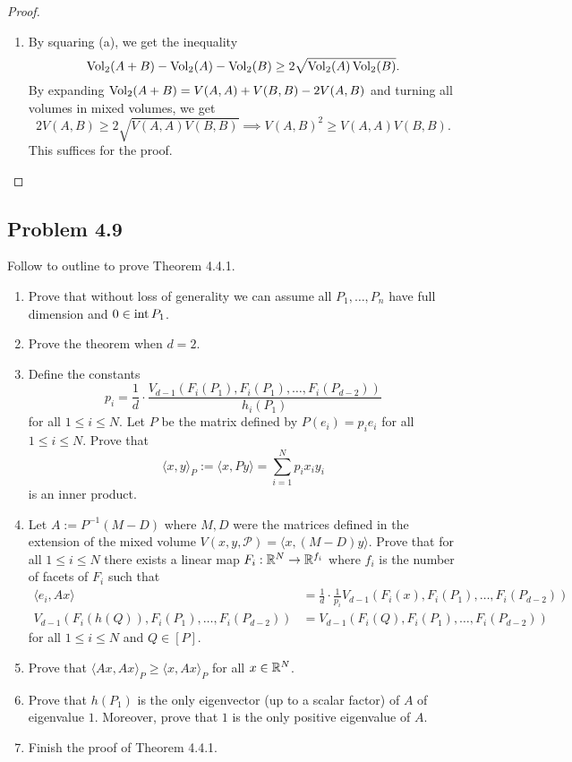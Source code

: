 \documentclass[12pt]{article}
\begin{document}
\begin{proof}
\begin{enumerate}[label = (\alph*)]
		\item By squaring (a), we get the inequality 
		\[
			\operatorname{Vol}_2(A + B) - \operatorname{Vol}_2(A) - \operatorname{Vol}_2(B) \geq 2 \sqrt{\operatorname{Vol}_2(A) \operatorname{Vol}_2(B)}.
		\]
		By expanding $\operatorname{Vol}_2(A + B) = V(A, A) + V(B, B) - 2 V(A, B)$ and turning all volumes in mixed volumes, we get 
		\[
			2V(A, B) \geq 2 \sqrt{V(A, A) V(B, B)} \implies V(A, B)^2 \geq V(A, A) V(B, B). 
		\]
		This suffices for the proof. 
	\end{enumerate}
\end{proof}

\newpage 

\subsection{Problem 4.9}

\begin{problem} \label{problem-4.9}
	Follow to outline to prove Theorem 4.4.1.
    \begin{enumerate}[label = (\alph*)]
        \item Prove that without loss of generality we can assume all $P_1, \ldots, P_n$ have full dimension and $0 \in \operatorname{int} P_1$.
        \item Prove the theorem when $d = 2$. 
        \item Define the constants 
        \[
            p_i = \frac{1}{d} \cdot \frac{V_{d-1}(F_i(P_1), F_i(P_1), \ldots, F_i(P_{d-2}))}{h_i(P_1)}
        \]
        for all $1 \leq i \leq N$. Let $P$ be the matrix defined by $P(e_i) = p_i e_i$ for all $1 \leq i \leq N$. Prove that 
        \[
            \langle x, y \rangle_P := \langle x, Py \rangle = \sum_{i = 1}^N p_i x_i y_i  
        \]
        is an inner product. 
        \item Let $A := P^{-1}(M-D)$ where $M, D$ were the matrices defined in the extension of the mixed volume $V(x, y, \mathcal{P}) = \langle x, (M-D)y \rangle$. Prove that for all $1 \leq i \leq N$ there exists a linear map $F_i : \mathbb{R}^N \to \mathbb{R}^{f_i}$ where $f_i$ is the number of facets of $F_i$ such that 
        \begin{align*}
            \langle e_i, A x \rangle & = \frac{1}{d} \cdot \frac{1}{p_i} V_{d-1}(F_i(x), F_i(P_1), \ldots, F_i(P_{d-2})) \\
            V_{d-1}(F_i(h(Q)), F_i(P_1), \ldots, F_i(P_{d-2})) & = V_{d-1}(F_i(Q), F_i(P_1), \ldots, F_i(P_{d-2}))
        \end{align*}
        for all $1 \leq i \leq N$ and $Q \in [P]$. 
        \item Prove that $\langle Ax, Ax \rangle_P \geq \langle x, Ax \rangle_P$ for all $x \in \mathbb{R}^N$. 
        \item Prove that $h(P_1)$ is the only eigenvector (up to a scalar factor) of $A$ of eigenvalue $1$. Moreover, prove that $1$ is the only positive eigenvalue of $A$. 
        \item Finish the proof of Theorem 4.4.1.
    \end{enumerate}
\end{problem}
\end{document}
